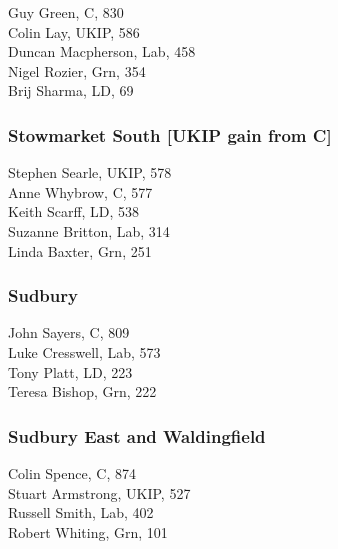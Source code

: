 \documentclass[a4paper,openany,10pt]{book}
\begin{document}


Guy Green, C, 830\\
Colin Lay, UKIP, 586\\
Duncan Macpherson, Lab, 458\\
Nigel Rozier, Grn, 354\\
Brij Sharma, LD, 69\\


\subsubsection*{Stowmarket South \hspace*{\fill}\nolinebreak[1]%
\enspace\hspace*{\fill}
[UKIP gain from C]}



Stephen Searle, UKIP, 578\\
Anne Whybrow, C, 577\\
Keith Scarff, LD, 538\\
Suzanne Britton, Lab, 314\\
Linda Baxter, Grn, 251\\


\subsubsection*{Sudbury}



John Sayers, C, 809\\
Luke Cresswell, Lab, 573\\
Tony Platt, LD, 223\\
Teresa Bishop, Grn, 222\\


\subsubsection*{Sudbury East and Waldingfield}



Colin Spence, C, 874\\
Stuart Armstrong, UKIP, 527\\
Russell Smith, Lab, 402\\
Robert Whiting, Grn, 101\\
\end{document}
